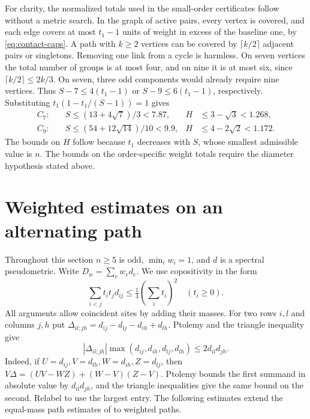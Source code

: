 \documentclass[11pt,a4paper]{article}
\theoremstyle{definition}
\begin{document}
For clarity, the normalized totals used in the small-order certificates
follow without a metric search. In the graph of active pairs, every
vertex is covered, and each edge covers at most $t_1-1$ units of weight
in excess of the baseline one, by \eqref{eq:contact-caps}. A path with
$k\ge2$ vertices can be covered by $\lceil k/2\rceil$ adjacent pairs
or singletons. Removing one link from a cycle is harmless. On seven
vertices the total number of groups is at most four, and on nine it is
at most six, since $\lceil k/2\rceil\le2k/3$. On seven, three odd
components would already require nine vertices. Thus
$S-7\le4(t_1-1)$ or $S-9\le6(t_1-1)$, respectively. Substituting
$t_1(1-t_1/(S-1))=1$ gives
\[
 \begin{aligned}
 C_7:\quad &S\le(13+4\sqrt7)/3<7.87,& H&\le3-\sqrt3<1.268,\\
 C_9:\quad &S\le(54+12\sqrt{14})/10<9.9,& H&\le4-2\sqrt2<1.172 .
 \end{aligned}
\]
The bounds on $H$ follow because $t_1$ decreases with $S$, whose
smallest admissible value is $n$. The bounds on the order-specific weight totals require the diameter hypothesis stated above.

\section{Weighted estimates on an alternating path}\label{sec:geometry}

Throughout this section $n\ge5$ is odd, $\min_iw_i=1$, and $d$ is a
spectral pseudometric. Write $D_w=\sum_e w_e d_e$. We use copositivity
in the form
\begin{equation}
 \sum_{i<j}t_it_jd_{ij}\le\tfrac14(\sum_i t_i)^2
 \quad(t_i\ge0).\label{eq:wgcp}
\end{equation}
All arguments allow coincident sites by adding their masses.
For two rows $i,l$ and columns $j,h$ put
$\Delta_{il;jh}=d_{ij}-d_{lj}-d_{ih}+d_{lh}$. Ptolemy and the
triangle inequality give
\begin{equation}
 |\Delta_{il;jh}|\max(d_{ij},d_{ih},d_{lj},d_{lh})
 \le 2d_{il}d_{jh}.\label{eq:wgmix}
\end{equation}
Indeed, if $U=d_{ij},V=d_{lh},W=d_{ih},Z=d_{lj}$, then
$V\Delta=(UV-WZ)+(W-V)(Z-V)$. Ptolemy bounds the first summand
in absolute value by $d_{il}d_{jh}$, and the triangle inequalities
give the same bound on the second. Relabel to use the largest entry.
The following estimates extend the equal-mass path estimates of
\cite{Jiang} to weighted paths.
\end{document}
